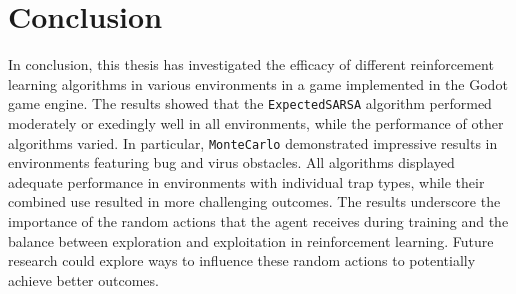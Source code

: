 \chapter*{Conclusion}

In conclusion, this thesis has investigated the efficacy of different reinforcement learning algorithms in various environments in a game implemented in the Godot game engine. The results showed that the \texttt{ExpectedSARSA} algorithm performed moderately or exedingly well in all environments, while the performance of other algorithms varied. In particular, \texttt{MonteCarlo} demonstrated impressive results in environments featuring bug and virus obstacles. All algorithms displayed adequate performance in environments with individual trap types, while their combined use resulted in more challenging outcomes. The results underscore the importance of the random actions that the agent receives during training and the balance between exploration and exploitation in reinforcement learning. Future research could explore ways to influence these random actions to potentially achieve better outcomes.